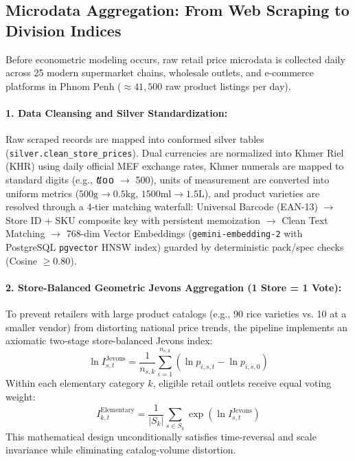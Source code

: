 \documentclass[a4paper, 11pt]{article}
\newcommand{\khmer}[1]{{\khmerfont #1}}
\begin{document}
\subsection{Microdata Aggregation: From Web Scraping to Division Indices}
Before econometric modeling occurs, raw retail price microdata is collected daily across 25 modern supermarket chains, wholesale outlets, and e-commerce platforms in Phnom Penh ($\approx 41,500$ raw product listings per day).

\paragraph{1. Data Cleansing and Silver Standardization:}
Raw scraped records are mapped into conformed silver tables (\texttt{silver.clean\_store\_prices}). Dual currencies are normalized into Khmer Riel (KHR) using daily official MEF exchange rates, Khmer numerals are mapped to standard digits (e.g., \khmer{៥០០} $\rightarrow$ 500), units of measurement are converted into uniform metrics ($500\text{g} \rightarrow 0.5\text{kg}$, $1500\text{ml} \rightarrow 1.5\text{L}$), and product varieties are resolved through a 4-tier matching waterfall: Universal Barcode (EAN-13) $\rightarrow$ Store ID + SKU composite key with persistent memoization $\rightarrow$ Clean Text Matching $\rightarrow$ 768-dim Vector Embeddings (\texttt{gemini-embedding-2} with PostgreSQL \texttt{pgvector} HNSW index) guarded by deterministic pack/spec checks (Cosine $\ge 0.80$).

\paragraph{2. Store-Balanced Geometric Jevons Aggregation (1 Store = 1 Vote):}
To prevent retailers with large product catalogs (e.g., 90 rice varieties vs. 10 at a smaller vendor) from distorting national price trends, the pipeline implements an axiomatic two-stage store-balanced Jevons index:
\begin{equation}
    \ln I_{s, t}^{\text{Jevons}} = \frac{1}{n_{s, k}} \sum_{i=1}^{n_{s, k}} \left( \ln p_{i, s, t} - \ln p_{i, s, 0} \right)
\end{equation}
Within each elementary category $k$, eligible retail outlets receive equal voting weight:
\begin{equation}
    I_{k, t}^{\text{Elementary}} = \frac{1}{|S_k|} \sum_{s \in S_k} \exp\left( \ln I_{s, t}^{\text{Jevons}} \right)
\end{equation}
This mathematical design unconditionally satisfies time-reversal and scale invariance while eliminating catalog-volume distortion.
\end{document}
